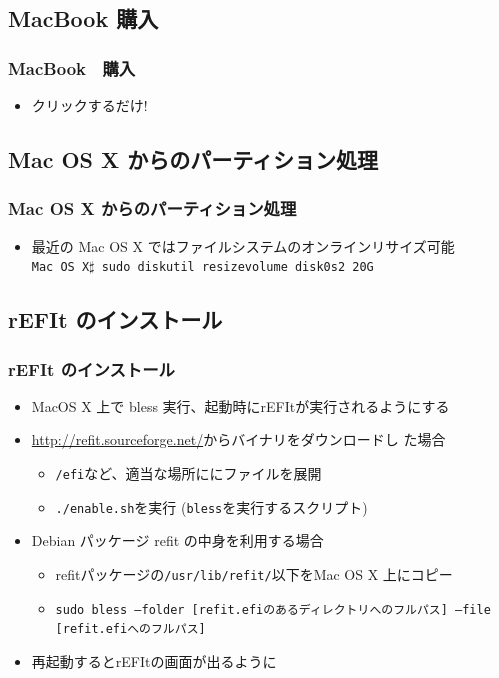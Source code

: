 \documentclass[cjk,dvipdfmx]{beamer}
\begin{document}
\subsection{MacBook 購入} 

\begin{frame}
 \frametitle{MacBook　購入}
 \begin{minipage}{0.5\hsize}
  \begin{itemize}
   \item クリックするだけ!
  \end{itemize}
 \end{minipage}
\end{frame}

\subsection{Mac OS X からのパーティション処理}

\begin{frame}
 \frametitle{Mac OS X からのパーティション処理}
\begin{itemize}
 \item 最近の Mac OS X ではファイルシステムのオンラインリサイズ可能\\
       \texttt{Mac OS X$\sharp$  sudo diskutil resizevolume disk0s2 20G}
\end{itemize}
\end{frame}

\subsection{rEFIt のインストール}

\begin{frame}
 \frametitle{rEFIt のインストール}
 \begin{itemize}
  \item MacOS X 上で bless 実行、起動時にrEFItが実行されるようにする
  \item \url{http://refit.sourceforge.net/}からバイナリをダウンロードし
	た場合
  \begin{itemize}
   \item \texttt{/efi}など、適当な場所ににファイルを展開
   \item \texttt{./enable.sh}を実行 (\texttt{bless}を実行するスクリプト)
  \end{itemize} 
  \item Debian パッケージ refit の中身を利用する場合
  \begin{itemize}
   \item refitパッケージの\texttt{/usr/lib/refit/}以下をMac OS X 上にコピー
   \item \texttt{sudo bless --folder [refit.efiのあるディレクトリへのフルパス] --file [refit.efiへのフルパス]}
  \end{itemize}
 \item 再起動するとrEFItの画面が出るように
 \end{itemize}
\end{frame}
\end{document}
